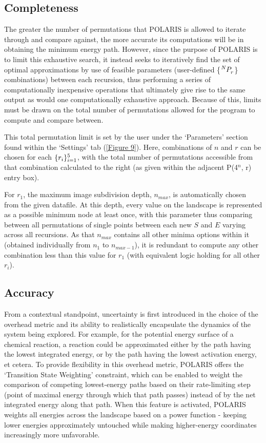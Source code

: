 \documentclass[twocolumn]{biophys-new}
\begin{document}
\subsection*{Completeness}

The greater the number of permutations that POLARIS is allowed to iterate through and compare against, the more accurate its computations will be in obtaining the minimum energy path. However, since the purpose of POLARIS is to limit this exhaustive search, it instead seeks to iteratively find the set of optimal approximations by use of feasible parameters (user-defined \{$\tensor*[^{N}_{}]{P}{^{}_r}$\} combinations) between each recursion, thus performing a series of computationally inexpensive operations that ultimately give rise to the same output as would one computationally exhaustive approach. Because of this, limits must be drawn on the total number of permutations allowed for the program to compute and compare between.

This total permutation limit is set by the user under the `Parameters' section found within the `Settings' tab (\autoref{Figure 9}). Here, combinations of $n$ and $r$ can be chosen for each $\{r_i\}\tensor*{}{*^{5}_{i=1}}$, with the total number of permutations accessible from that combination calculated to the right (as given within the adjacent P(4$^n$, r) entry box).

For $r_1$, the maximum image subdivision depth, $n_{max}$, is automatically chosen from the given datafile. At this depth, every value on the landscape is represented as a possible minimum node at least once, with this parameter thus comparing between all permutations of single points between each new $S$ and $E$ varying across all recursions. As that $n_{max}$ contains all other minima options within it (obtained individually from $n_{1}$ to $n_{max-1}$), it is redundant to compute any other combination less than this value for $r_1$ (with equivalent logic holding for all other $r_i$).

\subsection*{Accuracy}

From a contextual standpoint, uncertainty is first introduced in the choice of the overhead metric and its ability to realistically encapsulate the dynamics of the system being explored. For example, for the potential energy surface of a chemical reaction, a reaction could be approximated either by the path having the lowest integrated energy, or by the path having the lowest activation energy, et cetera. To provide flexibility in this overhead metric, POLARIS offers the `Transition State Weighting' constraint, which can be enabled to weight the comparison of competing lowest-energy paths based on their rate-limiting step (point of maximal energy through which that path passes) instead of by the net integrated energy along that path. When this feature is activated, POLARIS weights all energies across the landscape based on a power function - keeping lower energies approximately untouched while making higher-energy coordinates increasingly more unfavorable. 
\end{document}
